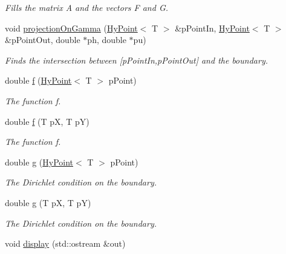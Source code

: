 \begin{DoxyCompactItemize}
\begin{DoxyCompactList}\small\item\em Fills the matrix A and the vectors F and G. \item\end{DoxyCompactList}\item 
void \hyperlink{classHyProblem2D_a5a300ef6e1863ff9ed16fccb853e3e68}{projectionOnGamma} (\hyperlink{classHyPoint}{HyPoint}$<$ T $>$ \&pPointIn, \hyperlink{classHyPoint}{HyPoint}$<$ T $>$ \&pPointOut, double $\ast$ph, double $\ast$pu)
\begin{DoxyCompactList}\small\item\em Finds the intersection between \mbox{[}pPointIn,pPointOut\mbox{]} and the boundary. \item\end{DoxyCompactList}\item 
double \hyperlink{classHyProblem2D_a01c5fa60862c89ded1a64f019f24b866}{f} (\hyperlink{classHyPoint}{HyPoint}$<$ T $>$ pPoint)
\begin{DoxyCompactList}\small\item\em The function f. \item\end{DoxyCompactList}\item 
double \hyperlink{classHyProblem2D_ad12f53b0d42866701690300d520aa8b2}{f} (T pX, T pY)
\begin{DoxyCompactList}\small\item\em The function f. \item\end{DoxyCompactList}\item 
double \hyperlink{classHyProblem2D_a3b2b6264520c3f1ee7e475ea3785d26d}{g} (\hyperlink{classHyPoint}{HyPoint}$<$ T $>$ pPoint)
\begin{DoxyCompactList}\small\item\em The Dirichlet condition on the boundary. \item\end{DoxyCompactList}\item 
double \hyperlink{classHyProblem2D_acf8413f6d284ffaab2194a3dd43e56b8}{g} (T pX, T pY)
\begin{DoxyCompactList}\small\item\em The Dirichlet condition on the boundary. \item\end{DoxyCompactList}\item 
\hypertarget{classHyProblem2D_a52a12ef372b76e4af02c4804173116da}{
void \hyperlink{classHyProblem2D_a52a12ef372b76e4af02c4804173116da}{display} (std::ostream \&out)}
\label{classHyProblem2D_a52a12ef372b76e4af02c4804173116da}


\end{DoxyCompactItemize}
